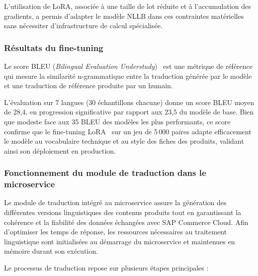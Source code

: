 L'utilisation de LoRA, associée à une taille de lot réduite et à l'accumulation des gradients, a permis d'adapter le modèle NLLB dans ces contraintes matérielles sans nécessiter d'infrastructure de calcul spécialisée.

\subsubsection{Résultats du fine-tuning}

Le score BLEU (\textit{Bilingual Evaluation Understudy})~ est une métrique de référence qui mesure la similarité n-grammatique entre la traduction générée par le modèle et une traduction de référence produite par un humain.

L'évaluation sur 7 langues (30 échantillons chacune) donne un score BLEU moyen de 28,4, en progression significative par rapport aux 23,5 du modèle de base. Bien que modeste face aux 35 BLEU des modèles les plus performants, ce score confirme que le fine-tuning LoRA~ sur un jeu de 5\,000 paires adapte efficacement le modèle au vocabulaire technique et au style des fiches des produits, validant ainsi son déploiement en production.

\subsubsection{Fonctionnement du module de traduction dans le microservice}

Le module de traduction intégré au microservice assure la génération des différentes versions linguistiques des contenus produits tout en garantissant la cohérence et la fiabilité des données échangées avec SAP Commerce Cloud. Afin d'optimiser les temps de réponse, les ressources nécessaires au traitement linguistique sont initialisées au démarrage du microservice et maintenues en mémoire durant son exécution. 

Le processus de traduction repose sur plusieurs étapes principales :

